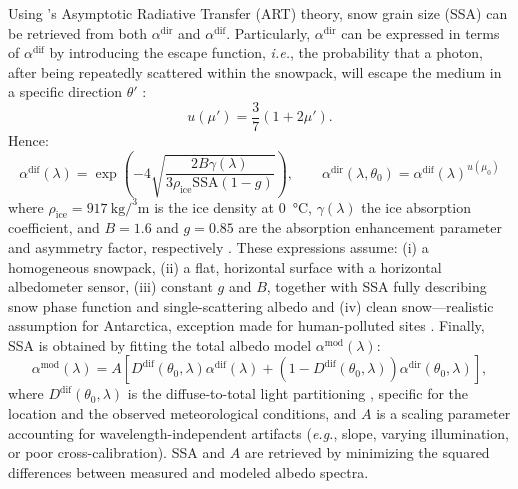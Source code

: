 \documentclass[11pt,a4paper]{article}
\newcommand{\ie}{\emph{i.e.}, }
\newcommand{\eg}{\emph{e.g.}, }
\newcommand{\ssa}{\mathrm{SSA}}
\begin{document}
Using \cite{kokhanovskyScatteringOpticsSnow2004}'s Asymptotic Radiative Transfer (ART) theory, snow grain size (SSA) can be retrieved from both $\alpha^\mathrm{dir}$ and $\alpha^\mathrm{dif}$. Particularly, $\alpha^\mathrm{dir}$ can be expressed in terms of $\alpha^\mathrm{dif}$ by introducing the escape function, \ie the probability that a photon, after being repeatedly scattered within the snowpack, will escape the medium in a specific direction $\theta'$ \parencite{sobolevLightScatteringPlanetary2014}:
\begin{equation}\label{eq:escape}
	u(\mu') = \frac{3}{7}(1 + 2\mu').
\end{equation}
Hence:
\begin{equation}
	\alpha^\mathrm{dif}(\lambda) = \exp \left(-4 \sqrt{\frac{2 B \gamma(\lambda)}{3 \rho_\mathrm{ice} \ssa (1 -g)}}\right), \qquad \alpha^\mathrm{dir}(\lambda, \theta_0) = \alpha^\mathrm{dif}(\lambda)^{u(\mu_0)}
\end{equation}
where $\rho_\mathrm{ice} = \qty{917}{\kilo\gram\per\cubed\meter}$ is the ice density at \qty{0}{\celsius}, $\gamma(\lambda)$ the ice absorption coefficient, and $B = 1.6$ and $g = 0.85$ are the absorption enhancement parameter and asymmetry factor, respectively \parencite{liboisExperimentalDeterminationAbsorption2014}. These expressions assume: (i) a homogeneous snowpack, (ii) a flat, horizontal surface with a horizontal albedometer sensor, (iii) constant $g$ and $B$, together with SSA fully describing snow phase function and single-scattering albedo and (iv) clean snow---realistic assumption for Antarctica, exception made for human-polluted sites \parencite{caseySpectralChemicalMeasurement2017}. Finally, SSA is obtained by fitting the total albedo model $\alpha^\mathrm{mod}(\lambda)$:
\begin{equation}
	\alpha^\mathrm{mod}(\lambda) = A \left[ D^\mathrm{dif}(\theta_0, \lambda) \alpha^\mathrm{dif}(\lambda) + (1 - D^\mathrm{dif}(\theta_0, \lambda)) \alpha^\mathrm{dir}(\theta_0, \lambda) \right],
\end{equation}
where $D^\mathrm{dif}(\theta_0, \lambda)$ is the diffuse-to-total light partitioning \parencite{picardDevelopmentCalibrationAutomatic2016a}, specific for the location and the observed meteorological conditions, and $A$ is a scaling parameter accounting for wavelength-independent artifacts (\eg slope, varying illumination, or poor cross-calibration). SSA and $A$ are retrieved by minimizing the squared differences between measured and modeled albedo spectra.
\end{document}
